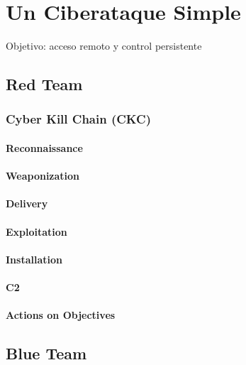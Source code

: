 \chapter{Un Ciberataque Simple}

Objetivo: acceso remoto y control persistente

\section{Red Team}

    \subsection{Cyber Kill Chain (CKC)}

        \subsubsection{Reconnaissance}

        \subsubsection{Weaponization}

        \subsubsection{Delivery}

        \subsubsection{Exploitation}

        \subsubsection{Installation}

        \subsubsection{C2}

        \subsubsection{Actions on Objectives}



\section{Blue Team}

